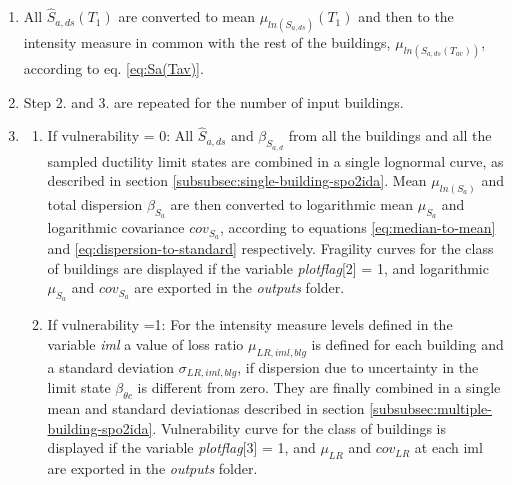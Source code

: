 \begin{enumerate}
\begin{itemize}
\end{itemize}

\item All $\hat{S}_{a, ds}(T_1)$ are converted to mean $\mu_{ln(S_{a, ds})}(T_1)$ and then to the intensity measure in common with the rest of the buildings, $\mu_{ln(S_{a, ds}(T_{av}))}$, according to eq. \ref{eq:Sa(Tav)}.

\item Step 2. and 3. are repeated for the number of input buildings.

\item
\begin{enumerate}

\item If vulnerability = 0: All $\hat{S}_{a,ds}$ and $\beta_{S_{a, d}}$ from all the buildings and all the sampled ductility limit states are combined in a single lognormal curve, as described in section \ref{subsubsec:single-building-spo2ida}. 
Mean $\mu_{ln(S_{a})}$ and total dispersion $\beta_{S_a}$ are then converted to logarithmic mean $\mu_{S_a}$ and logarithmic covariance $cov_{S_a}$, according to equations \ref{eq:median-to-mean} and \ref{eq:dispersion-to-standard} respectively.
Fragility curves for the class of buildings are displayed if the variable \textit{plotflag}[2] = 1, and logarithmic $\mu_{S_a}$ and $cov_{S_a}$ are exported in the \textit{outputs} folder.
\item If vulnerability =1:  
For the intensity measure levels defined in the variable \textit{iml} a value of loss ratio $\mu_{LR, iml, blg}$ is defined for each building and a standard deviation $\sigma_{LR, iml, blg}$, if dispersion due to uncertainty in the limit state $\beta_{\theta c}$ is different from zero. They are finally combined in a single mean and standard deviationas described in section \ref{subsubsec:multiple-building-spo2ida}. Vulnerability curve for the class of buildings is displayed if the variable \textit{plotflag}[3] = 1, and $\mu_{LR}$ and $cov_{LR}$ at each iml are exported in the \textit{outputs} folder.
\end{enumerate}

\end{enumerate}